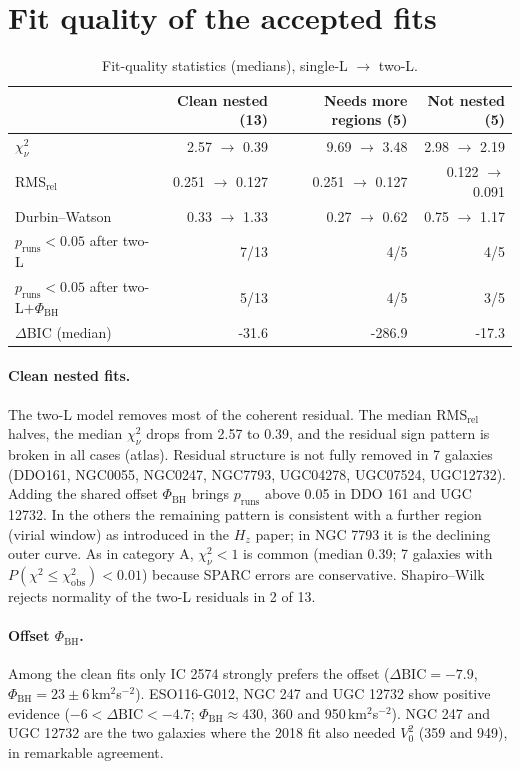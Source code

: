 \documentclass[10pt]{article}
\begin{document}
\section{Fit quality of the accepted fits}
\begin{table}[h]\centering\small\caption{Fit-quality statistics (medians), single-L $\to$ two-L.}\begin{tabular}{lrrr}\toprule & Clean nested (13) & Needs more regions (5) & Not nested (5)\\\midrule
$\chi^2_\nu$ & 2.57 $\to$ 0.39 & 9.69 $\to$ 3.48 & 2.98 $\to$ 2.19\\
RMS$_\mathrm{rel}$ & 0.251 $\to$ 0.127 & 0.251 $\to$ 0.127 & 0.122 $\to$ 0.091\\
Durbin--Watson & 0.33 $\to$ 1.33 & 0.27 $\to$ 0.62 & 0.75 $\to$ 1.17\\
$p_\mathrm{runs}<0.05$ after two-L & 7/13 & 4/5 & 4/5\\
$p_\mathrm{runs}<0.05$ after two-L$+\Phi_\mathrm{BH}$ & 5/13 & 4/5 & 3/5\\
$\Delta$BIC (median) & -31.6 & -286.9 & -17.3\\
\bottomrule\end{tabular}\end{table}
\paragraph{Clean nested fits.} The two-L model removes most of the coherent residual. The median RMS$_\mathrm{rel}$ halves, the median $\chi^2_\nu$ drops from 2.57 to 0.39, and the residual sign pattern is broken in all cases (atlas). Residual structure is not fully removed in 7 galaxies (DDO161, NGC0055, NGC0247, NGC7793, UGC04278, UGC07524, UGC12732). Adding the shared offset $\Phi_\mathrm{BH}$ brings $p_\mathrm{runs}$ above 0.05 in DDO 161 and UGC 12732. In the others the remaining pattern is consistent with a further region (virial window) as introduced in the $H_z$ paper; in NGC 7793 it is the declining outer curve. As in category A, $\chi^2_\nu<1$ is common (median 0.39; 7 galaxies with $P(\chi^2\le\chi^2_\mathrm{obs})<0.01$) because SPARC errors are conservative. Shapiro--Wilk rejects normality of the two-L residuals in 2 of 13.

\paragraph{Offset $\Phi_\mathrm{BH}$.} Among the clean fits only IC 2574 strongly prefers the offset ($\Delta\mathrm{BIC}=-7.9$, $\Phi_\mathrm{BH}=23\pm6$\,km$^2$s$^{-2}$). ESO116-G012, NGC 247 and UGC 12732 show positive evidence ($-6<\Delta\mathrm{BIC}<-4.7$; $\Phi_\mathrm{BH}\approx430$, 360 and 950\,km$^2$s$^{-2}$). NGC 247 and UGC 12732 are the two galaxies where the 2018 fit also needed $V_0^2$ (359 and 949), in remarkable agreement.
\end{document}
